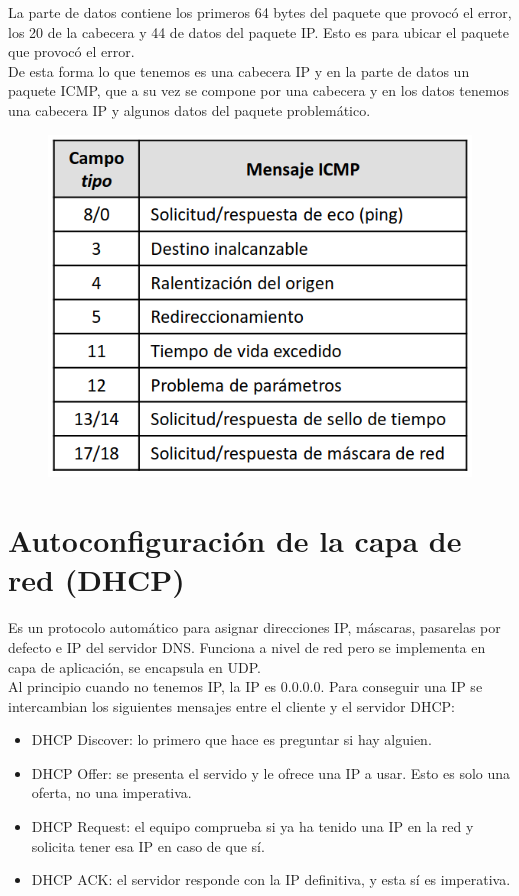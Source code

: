 La parte de datos contiene los primeros 64 bytes del paquete que provocó el error, los 20 de la cabecera y 44 de datos del paquete IP. Esto es para ubicar el paquete que provocó el error.\\

De esta forma lo que tenemos es una cabecera IP y en la parte de datos un paquete ICMP, que a su vez se compone por una cabecera y en los datos tenemos una cabecera IP y algunos datos del paquete problemático.

\begin{figure}[H]
    \centering
    \includegraphics[width=0.4\linewidth]{./images/codigos-icmp.png}
    \label{fig:icmp}
\end{figure}

\section{Autoconfiguración de la capa de red (\acrfull{DHCP})}

Es un protocolo automático para asignar direcciones IP, máscaras, pasarelas por defecto e IP del servidor \acrshort{DNS}. Funciona a nivel de red pero se implementa en capa de aplicación, se encapsula en \acrshort{UDP}. \\

Al principio cuando no tenemos IP, la IP es 0.0.0.0. Para conseguir una IP se intercambian los siguientes mensajes entre el cliente y el servidor DHCP:
\begin{itemize}
    \item DHCP Discover: lo primero que hace es preguntar si hay alguien. 
    \item DHCP Offer: se presenta el servido y le ofrece una IP a usar. Esto es solo una oferta, no una imperativa.
    \item DHCP Request: el equipo comprueba si ya ha tenido una IP en la red y solicita tener esa IP en caso de que sí. 
    \item DHCP ACK: el servidor responde con la IP definitiva, y esta sí es imperativa. 
\end{itemize}

